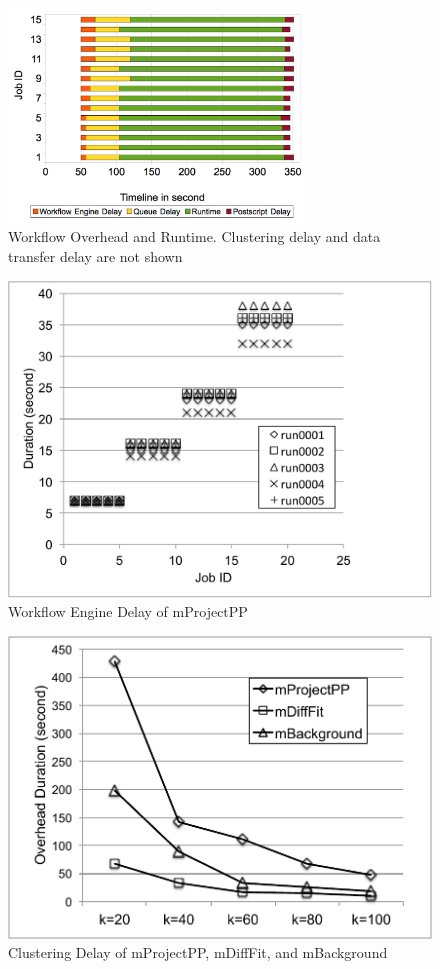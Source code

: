 \begin{figure}[h!]
	\centering
    \includegraphics[width=0.7\textwidth]{figures/model/overhead_timeline2.pdf}
    \caption{Workflow Overhead and Runtime. Clustering delay and data transfer delay are not shown}
    \label{fig:model_montage_timeline}
\end{figure}




\begin{figure}

\centering
  \includegraphics[width=0.6\linewidth]{figures/model/montage_five_runs.pdf}
    \caption{Workflow Engine Delay of mProjectPP}
    \label{fig:model_montage_five_runs}
\end{figure}%
\begin{figure}
  \centering
  \includegraphics[width=0.6\linewidth]{figures/model/montage_clustering_delay.pdf}
    \caption{Clustering Delay of mProjectPP, mDiffFit, and mBackground}
    \label{fig:model_montage_clustering}
\end{figure}





